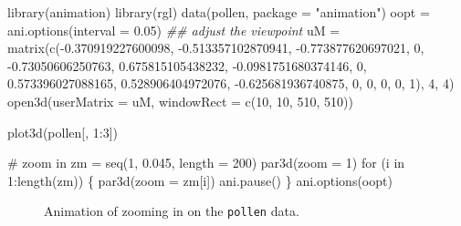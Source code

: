 \documentclass[
  letterpaper,
  10pt,
  krantz2]{krantz}
\makeatletter
\newenvironment{Shaded}{\begin{snugshade}}{\end{snugshade}}
\newcommand{\AttributeTok}[1]{\textcolor[rgb]{0.40,0.45,0.13}{#1}}
\newcommand{\CommentTok}[1]{\textcolor[rgb]{0.37,0.37,0.37}{#1}}
\newcommand{\ControlFlowTok}[1]{\textcolor[rgb]{0.00,0.23,0.31}{#1}}
\newcommand{\DecValTok}[1]{\textcolor[rgb]{0.68,0.00,0.00}{#1}}
\newcommand{\DocumentationTok}[1]{\textcolor[rgb]{0.37,0.37,0.37}{\textit{#1}}}
\newcommand{\FloatTok}[1]{\textcolor[rgb]{0.68,0.00,0.00}{#1}}
\newcommand{\FunctionTok}[1]{\textcolor[rgb]{0.28,0.35,0.67}{#1}}
\newcommand{\NormalTok}[1]{\textcolor[rgb]{0.00,0.23,0.31}{#1}}
\newcommand{\OtherTok}[1]{\textcolor[rgb]{0.00,0.23,0.31}{#1}}
\newcommand{\SpecialCharTok}[1]{\textcolor[rgb]{0.37,0.37,0.37}{#1}}
\newcommand{\StringTok}[1]{\textcolor[rgb]{0.13,0.47,0.30}{#1}}
\newenvironment{kframe}{%
  \medskip{}
  \setlength{\fboxsep}{.8em}
  \def\at@end@of@kframe{}%
  \ifinner\ifhmode%
  \def\at@end@of@kframe{\end{minipage}}%
  \begin{minipage}{\columnwidth}%
  \fi\fi%
  \def\FrameCommand##1{\hskip\@totalleftmargin \hskip-\fboxsep
  \colorbox{shadecolor}{##1}\hskip-\fboxsep
      \hskip-\linewidth \hskip-\@totalleftmargin \hskip\columnwidth}%
  \MakeFramed {\advance\hsize-\width
    \@totalleftmargin\z@ \linewidth\hsize
    \@setminipage}}%
{\par\unskip\endMakeFramed%
  \at@end@of@kframe}
\renewenvironment{Shaded}{\begin{kframe}}{\end{kframe}}
\makeatother
\begin{document}
\begin{Shaded}
\begin{Highlighting}[]
\FunctionTok{library}\NormalTok{(animation)}
\FunctionTok{library}\NormalTok{(rgl)}
\FunctionTok{data}\NormalTok{(pollen, }\AttributeTok{package =} \StringTok{"animation"}\NormalTok{)}
\NormalTok{oopt }\OtherTok{=} \FunctionTok{ani.options}\NormalTok{(}\AttributeTok{interval =} \FloatTok{0.05}\NormalTok{)}
\DocumentationTok{\#\# adjust the viewpoint}
\NormalTok{uM }\OtherTok{=}
  \FunctionTok{matrix}\NormalTok{(}\FunctionTok{c}\NormalTok{(}\SpecialCharTok{{-}}\FloatTok{0.370919227600098}\NormalTok{, }\SpecialCharTok{{-}}\FloatTok{0.513357102870941}\NormalTok{,}
           \SpecialCharTok{{-}}\FloatTok{0.773877620697021}\NormalTok{, }\DecValTok{0}\NormalTok{, }\SpecialCharTok{{-}}\FloatTok{0.73050606250763}\NormalTok{, }\FloatTok{0.675815105438232}\NormalTok{,}
           \SpecialCharTok{{-}}\FloatTok{0.0981751680374146}\NormalTok{, }\DecValTok{0}\NormalTok{, }\FloatTok{0.573396027088165}\NormalTok{, }\FloatTok{0.528906404972076}\NormalTok{,}
           \SpecialCharTok{{-}}\FloatTok{0.625681936740875}\NormalTok{, }\DecValTok{0}\NormalTok{, }\DecValTok{0}\NormalTok{, }\DecValTok{0}\NormalTok{, }\DecValTok{0}\NormalTok{, }\DecValTok{1}\NormalTok{), }\DecValTok{4}\NormalTok{, }\DecValTok{4}\NormalTok{)}
\FunctionTok{open3d}\NormalTok{(}\AttributeTok{userMatrix =}\NormalTok{ uM, }
       \AttributeTok{windowRect =} \FunctionTok{c}\NormalTok{(}\DecValTok{10}\NormalTok{, }\DecValTok{10}\NormalTok{, }\DecValTok{510}\NormalTok{, }\DecValTok{510}\NormalTok{))}

\FunctionTok{plot3d}\NormalTok{(pollen[, }\DecValTok{1}\SpecialCharTok{:}\DecValTok{3}\NormalTok{])}

\CommentTok{\# zoom in}
\NormalTok{zm }\OtherTok{=} \FunctionTok{seq}\NormalTok{(}\DecValTok{1}\NormalTok{, }\FloatTok{0.045}\NormalTok{, }\AttributeTok{length =} \DecValTok{200}\NormalTok{)}
\FunctionTok{par3d}\NormalTok{(}\AttributeTok{zoom =} \DecValTok{1}\NormalTok{)}
\ControlFlowTok{for}\NormalTok{ (i }\ControlFlowTok{in} \DecValTok{1}\SpecialCharTok{:}\FunctionTok{length}\NormalTok{(zm)) \{}
  \FunctionTok{par3d}\NormalTok{(}\AttributeTok{zoom =}\NormalTok{ zm[i])}
  \FunctionTok{ani.pause}\NormalTok{()}
\NormalTok{\}}
\FunctionTok{ani.options}\NormalTok{(oopt)}
\end{Highlighting}
\end{Shaded}

\begin{figure}

{\centering 

}

\caption{\label{fig-pollen-eureka-fig}Animation of zooming in on the
\texttt{pollen} data.}

\end{figure}
\end{document}
